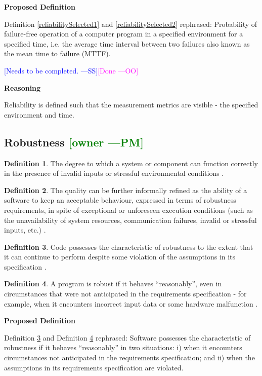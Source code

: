 \documentclass[letterpaper,cleveref]{lipics-v2019}
\newcommand{\authornote}[3]{\textcolor{#1}{[#3 ---#2]}}
\newcommand{\authornote}[3]{}
\newcommand{\wss}[1]{\authornote{blue}{SS}{#1}} %
\newcommand{\oo}[1]{\authornote{magenta}{OO}{#1}} %
\newcommand{\pmi}[1]{\authornote{green}{PM}{#1}} %
\theoremstyle{definition}
\newtheorem{defn}{Definition}
\begin{document}
\noindent \textbf{Proposed Definition}

Definition \ref{reliabilitySelected1} and \ref{reliabilitySelected2} rephrased:
Probability of failure-free operation of a computer program in a specified
environment for a specified time, i.e. the average time interval between two
failures also known as the mean time to failure (MTTF).

\wss{Needs to be completed.}\oo{Done}

\noindent \textbf{Reasoning}

Reliability is defined such that the measurement metrics are visible - the
specified environment and time. 

\subsection{{Robustness} \pmi{owner}}
\begin{defn}
	The degree to which a system or component can function correctly in the
	presence of invalid inputs or stressful environmental conditions
	\citep{IEEEStdGlossarySET1990}.
\end{defn}
\begin{defn}
	The quality can be further informally refined as the ability of a software to
	keep an acceptable behaviour, expressed in terms of robustness requirements,
	in
	spite of exceptional or unforeseen execution conditions (such as the
	unavailability of system resources, communication failures, invalid or
	stressful inputs, etc.) \citep{fernandez2005model}.
\end{defn}
\begin{defn} \label{RobustnessPartialDefn}
	Code possesses the characteristic of robustness to the extent that it can
	continue to perform despite some violation of the assumptions in its
	specification \citep{boehm2007software}.
\end{defn}
\begin{defn} \label{RobustnessDefnSelected}
	A program is robust if it behaves ``reasonably'', even in circumstances that
	were not anticipated in the requirements specification - for example, when it
	encounters incorrect input data or some hardware malfunction
	\citep{ghezzi1991fundamentals}.
\end{defn}

\noindent \textbf{Proposed Definition}

Definition \ref{RobustnessPartialDefn} and Definition
\ref{RobustnessDefnSelected} rephrased: Software possesses the characteristic of
robustness if it behaves ``reasonably'' in two situations: i) when it encounters
circumstances not anticipated in the requirements specification; and ii) when
the assumptions in its requirements specification are violated.
\end{document}
